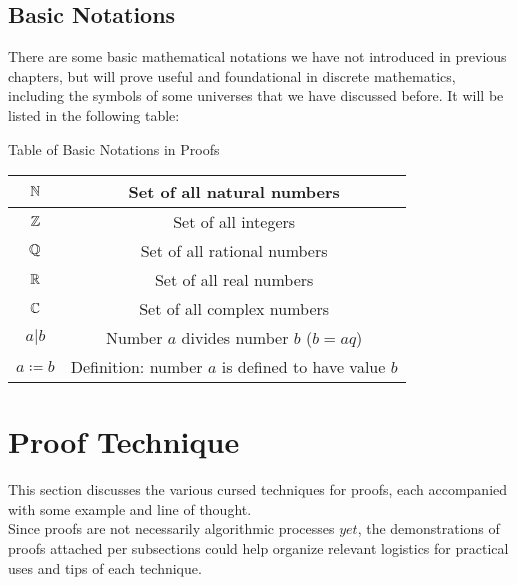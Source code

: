 \subsection{Basic Notations}
There are some basic mathematical notations we have not introduced in previous chapters, but will prove useful and foundational in discrete mathematics, including the symbols of some universes that we have discussed before. It will be listed in the following table:
\begin{ln-symbol}{Table of Basic Notations in Proofs}{}
    \begin{center}
        \begin{tabular}{|c|c|}
            \hline
            $\mathbb{N}$ & Set of all natural numbers \\
            \hline
            $\mathbb{Z}$ & Set of all integers \\
            \hline
            $\mathbb{Q}$ & Set of all rational numbers \\
            \hline
            $\mathbb{R}$ & Set of all real numbers \\
            \hline
            $\mathbb{C}$ & Set of all complex numbers \\
            \hline
            $a|b$ & Number $a$ divides number $b$ ($b = aq$) \\
            \hline
            $a \coloneqq b$ & Definition: number $a$ is defined to have value $b$ \\
            \hline
        \end{tabular}
    \end{center}
\end{ln-symbol}

\section{Proof Technique}
This section discusses the various cursed techniques for proofs, each accompanied with some example and line of thought. \\
Since proofs are not necessarily algorithmic processes \(yet\), the demonstrations of proofs attached per subsections could help organize relevant logistics for practical uses and tips of each technique.


